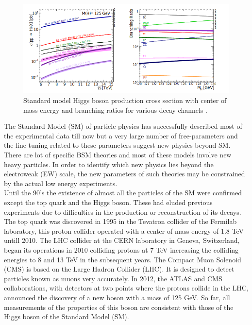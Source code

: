 \documentclass[final,3p]{CSP}
\begin{document}
\begin{figure}[H]
  \centering
   \includegraphics[scale=0.7]{./cd2.png}
  \caption{Standard model Higgs boson production cross section with center of mass energy and branching ratios for various decay channels \cite{Tanabashi:2018oca}.}
   \label{figure 3}
\end{figure}
\clearpage

 \newpage

The Standard Model (SM) of particle physics has successfully described most of the experimental data till now but a very large 
number of free-parameters and the fine tuning related to these parameters suggest new physics beyond SM. There are lot of specific 
BSM theories and most of these models involve new heavy particles. In order to identify which new physics lies beyond the 
electroweak (EW) scale, the new parameters  of such theories may be constrained by the actual low energy experiments. \\ 

Until the 90's the existence of almost all the particles of the SM were confirmed except the top quark and the Higgs boson. 
These had eluded previous experiments due to difficulties in the production or reconstruction of its decays. The top quark was 
discovered in 1995 in the Tevatron collider of the Fermilab laboratory, this proton collider operated with a center of mass 
energy of 1.8 TeV untill 2010. The LHC collider at the CERN laboratory in Geneva, Switzerland, began its operations in 2010 
colliding protons at 7 TeV increasing the colliding energies to 8 and 13 TeV in the subsequent years. The Compact Muon Solenoid (CMS) is based on the Large Hadron Collider (LHC). It is designed to detect particles known as muons very accurately. In 2012, the ATLAS and CMS collaborations, with detectors at two points where the protons collide in the LHC, announced the discovery of a new boson with a mass of 125 GeV. So far, all measurements of the properties of this boson are consistent with those of the Higgs boson of the Standard Model (SM). \\
\end{document}
